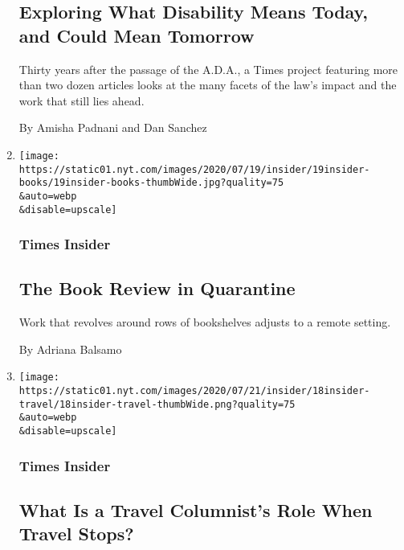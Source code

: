 \begin{enumerate}
{  \subsection{Exploring What Disability Means Today, and Could Mean
  Tomorrow}\label{exploring-what-disability-means-today-and-could-mean-tomorrow}}

  Thirty years after the passage of the A.D.A., a Times project
  featuring more than two dozen articles looks at the many facets of the
  law's impact and the work that still lies ahead.

  By Amisha Padnani and Dan Sanchez
\item
  \href{/2020/07/19/insider/times-book-review-remote.html}{}

  \texttt{[image: https://static01.nyt.com/images/2020/07/19/insider/19insider-books/19insider-books-thumbWide.jpg?quality=75\\\&auto=webp\\\&disable=upscale]}

  \hypertarget{times-insider-5}{%
  \subsubsection{Times Insider}\label{times-insider-5}}

  \hypertarget{the-book-review-in-quarantine}{%
  \subsection{The Book Review in
  Quarantine}\label{the-book-review-in-quarantine}}

  Work that revolves around rows of bookshelves adjusts to a remote
  setting.

  By Adriana Balsamo
\item
  \href{/2020/07/18/insider/travel-writing-pandemic.html}{}

  \texttt{[image: https://static01.nyt.com/images/2020/07/21/insider/18insider-travel/18insider-travel-thumbWide.png?quality=75\\\&auto=webp\\\&disable=upscale]}

  \hypertarget{times-insider-6}{%
  \subsubsection{Times Insider}\label{times-insider-6}}

  \hypertarget{what-is-a-travel-columnists-role-when-travel-stops}{%
  \subsection{What Is a Travel Columnist's Role When Travel
  Stops?}\label{what-is-a-travel-columnists-role-when-travel-stops}}


\end{enumerate}
